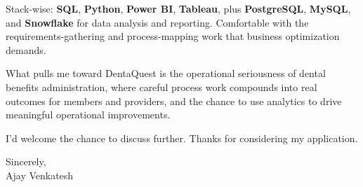 \documentclass[letterpaper,11pt]{article}
\begin{document}
Stack-wise: \textbf{SQL}, \textbf{Python}, \textbf{Power BI}, \textbf{Tableau}, plus \textbf{PostgreSQL}, \textbf{MySQL}, and \textbf{Snowflake} for data analysis and reporting. Comfortable with the requirements-gathering and process-mapping work that business optimization demands.

What pulls me toward DentaQuest is the operational seriousness of dental benefits administration, where careful process work compounds into real outcomes for members and providers, and the chance to use analytics to drive meaningful operational improvements.

I'd welcome the chance to discuss further. Thanks for considering my application.

\vspace{12pt}
Sincerely, \\
Ajay Venkatesh
\end{document}
